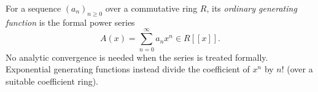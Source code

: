 
For a sequence $(a_n)_{n\ge0}$ over a commutative ring $R$, its \emph{ordinary generating function} is the formal power series
\[
A(x)=\sum_{n=0}^\infty a_nx^n\in R[[x]].
\]
No analytic convergence is needed when the series is treated formally. Exponential generating functions instead divide the coefficient of $x^n$ by $n!$ (over a suitable coefficient ring).
